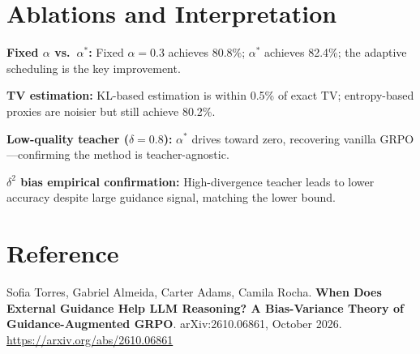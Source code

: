 \documentclass[10pt,twocolumn]{article}
\begin{document}
\section{Ablations and Interpretation}

\textbf{Fixed $\alpha$ vs.\ $\alpha^*$:} Fixed $\alpha{=}0.3$ achieves 80.8\%;
$\alpha^*$ achieves 82.4\%; the adaptive scheduling is the key improvement.

\textbf{TV estimation:} KL-based estimation is within 0.5\% of exact TV;
entropy-based proxies are noisier but still achieve 80.2\%.

\textbf{Low-quality teacher ($\delta{=}0.8$):} $\alpha^*$ drives toward zero,
recovering vanilla GRPO---confirming the method is teacher-agnostic.

\textbf{$\delta^2$ bias empirical confirmation:} High-divergence teacher leads
to lower accuracy despite large guidance signal, matching the lower bound.

\section*{Reference}

Sofia Torres, Gabriel Almeida, Carter Adams, Camila Rocha.
\textbf{When Does External Guidance Help LLM Reasoning? A Bias-Variance Theory
of Guidance-Augmented GRPO}.
arXiv:2610.06861, October 2026.\\
\url{https://arxiv.org/abs/2610.06861}
\end{document}
